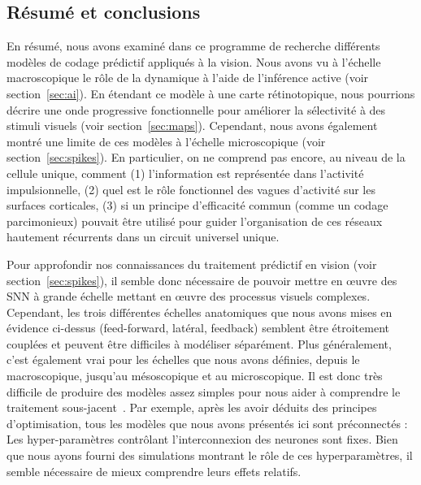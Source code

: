 \subsection{Résumé et conclusions}
En résumé, nous avons examiné dans ce programme de recherche différents modèles de
codage prédictif appliqués à la vision. Nous avons vu à l'échelle
macroscopique le rôle de la dynamique à l'aide de l'inférence active
(voir section~\ref{sec:ai}). En étendant ce modèle à une carte rétinotopique, nous
pourrions décrire une onde progressive fonctionnelle pour améliorer la sélectivité à des
stimuli visuels (voir section~\ref{sec:maps}). Cependant, nous avons également montré
une limite de ces modèles à l'échelle microscopique (voir section~\ref{sec:spikes}). En
particulier, on ne comprend pas encore, au niveau de la cellule unique,
comment (1) l'information est représentée dans l'activité impulsionnelle, (2)
quel est le rôle fonctionnel des vagues d'activité sur les surfaces
corticales, (3) si un principe d'efficacité commun (comme un codage
parcimonieux) pouvait être utilisé pour guider l'organisation de ces réseaux
hautement récurrents dans un circuit universel unique.

Pour approfondir nos connaissances du traitement prédictif en vision
(voir section~\ref{sec:spikes}), il semble donc nécessaire de pouvoir mettre en œuvre
des SNN à grande échelle mettant en œuvre des processus visuels
complexes. Cependant, les trois différentes échelles anatomiques que
nous avons mises en évidence ci-dessus (feed-forward, latéral, feedback)
semblent être étroitement couplées et peuvent être difficiles à
modéliser séparément. Plus généralement, c'est également vrai pour les
échelles que nous avons définies, depuis le macroscopique, jusqu'au mésoscopique
et au microscopique. Il est donc très difficile de produire des modèles
assez simples pour nous aider à comprendre le traitement sous-jacent~\citep{Varoquaux19,Brette19}. Par exemple, après les avoir
déduits des principes d'optimisation, tous les modèles que nous avons
présentés ici sont préconnectés : Les hyper-paramètres contrôlant
l'interconnexion des neurones sont fixes. Bien que nous ayons fourni des
simulations montrant le rôle de ces hyperparamètres, il semble
nécessaire de mieux comprendre leurs effets relatifs. %

